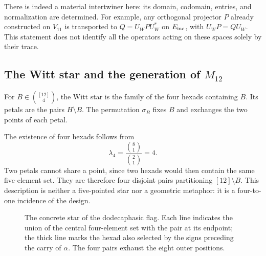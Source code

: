 There is indeed a material intertwiner here: its domain, codomain,
entries, and normalization are determined. For example, any
orthogonal projector $P$ already constructed on $V_{11}$ is transported to
$Q=U_WPU_W^*$ on $E_{\rm inc}$, with
$U_WP=QU_W$. This statement does not identify all the
operators acting on these spaces solely by their trace.

\subsection{The Witt star and the generation of \texorpdfstring{$M_{12}$}{M12}}
\label{exc:estrella}

\begin{definition}
\label{exc:def-estrella}
For $B\in\binom{[12]}4$, the Witt star is the family of the
four hexads containing $B$. Its petals are the pairs $H\setminus B$.
The permutation $\sigma_B$ fixes $B$ and exchanges the two points of each
petal.
\end{definition}

The existence of four hexads follows from
\[
 \lambda_4=\frac{\binom81}{\binom21}=4.
\]
Two petals cannot share a point, since two hexads would then
contain the same five-element set. They are therefore four disjoint pairs
partitioning $[12]\setminus B$. This description is neither a five-pointed
star nor a geometric metaphor: it is a four-to-one incidence
of the design.

\begin{figure}[htbp]
\centering
{}
\caption{The concrete star of the dodecaphasic flag. Each line
indicates the union of the central four-element set with the pair at its endpoint; the
thick line marks the hexad also selected by the signs
preceding the carry of $\alpha$. The four pairs exhaust the eight
outer positions.}
\label{exc:fig-estrella}
\end{figure}

